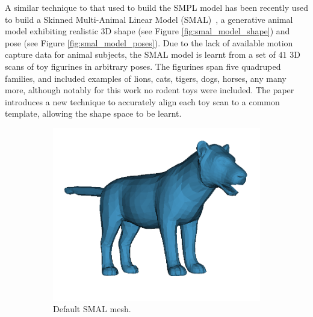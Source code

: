         A similar technique to that used to build the SMPL model has been recently used to build a Skinned Multi-Animal Linear Model (SMAL)~\cite{zuffi2017menagerie}, a generative animal model exhibiting realistic 3D shape (see Figure \ref{fig:smal_model_shape}) and pose (see Figure \ref{fig:smal_model_poses}). Due to the lack of available motion capture data for animal subjects, the SMAL model is learnt from a set of $41$ 3D scans of toy figurines in arbitrary poses. The figurines span five quadruped families, and included examples of lions, cats, tigers, dogs, horses, any many more, although notably for this work no rodent toys were included. The paper introduces a new technique to accurately align each toy scan to a common template, allowing the shape space to be learnt.

        \begin{figure}[H]
            \centering
            \begin{subfigure}{0.3\linewidth}
            \centering
                \includegraphics[width=1\linewidth]{smal/default}
                \caption{Default SMAL mesh.}
            \end{subfigure}%
            \begin{subfigure}{0.3\linewidth}
            \centering

\end{subfigure}
\end{figure}
